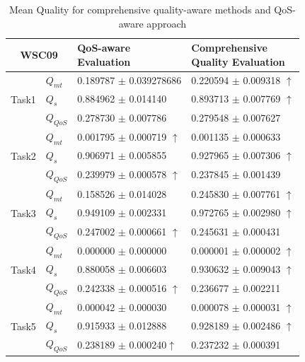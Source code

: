 \documentclass{IEEEtran}
\begin{document}
\begin{table}[]
\footnotesize
\centering
\caption{Mean Quality for comprehensive quality-aware methods and QoS-aware approach}
\label{decisionTable}
\begin{tabular}{l|l|l|l}
\hline
\multicolumn{2}{c|}{WSC09}              & \shortstack{QoS-aware \\ Evaluation} & \shortstack{Comprehensive \\ Quality Evaluation} \\ \hline
\multirow{3}{*}{Task1}  &$Q_{mt}$   &0.189787 $\pm$ 0.039278686  &0.220594 $\pm$ 0.009318 $\uparrow$ \\ \cline{2-4} 
                        &$Q_{s}$    &0.884962 $\pm$ 0.014140   &0.893713 $\pm$ 0.007769  $\uparrow$ \\ \cline{2-4}
                        &$Q_{QoS}$  &0.278730 $\pm$ 0.007786     &0.279548 $\pm$ 0.007627                          \\ \hline
\multirow{3}{*}{Task2}  &$Q_{mt}$   &0.001795 $\pm$ 0.000719 $\uparrow$    &0.001135 $\pm$ 0.000633  \\ \cline{2-4} 
                        &$Q_{s}$    &0.906971 $\pm$ 0.005855     &0.927965 $\pm$ 0.007306 $\uparrow$   \\ \cline{2-4}
                        &$Q_{QoS}$  &0.239979 $\pm$ 0.000578 $\uparrow$     &0.237845 $\pm$ 0.001439 \\ \hline
\multirow{3}{*}{Task3}  &$Q_{mt}$   &0.158526 $\pm$ 0.014028               &  0.245830 $\pm$ 0.007761 $\uparrow$   \\ \cline{2-4} 
                        &$Q_{s}$    &0.949109 $\pm$ 0.002331           &   0.972765 $\pm$ 0.002980 $\uparrow$           \\ \cline{2-4}
                        &$Q_{QoS}$  &0.247002 $\pm$ 0.000661 $\uparrow$             &  0.245631 $\pm$ 0.000431            \\ \hline
\multirow{3}{*}{Task4}  &$Q_{mt}$   &0.000000 $\pm$ 0.000000  &0.000001 $\pm$ 0.000002 $\uparrow$ \\ \cline{2-4} 
                        &$Q_{s}$    &0.880058 $\pm$ 0.006603    &0.930632 $\pm$ 0.009043 $\uparrow$ \\ \cline{2-4}
                        &$Q_{QoS}$  &0.242338 $\pm$ 0.000516 $\uparrow$    &0.236677 $\pm$ 0.002211  \\ \hline
\multirow{3}{*}{Task5}  &$Q_{mt}$   &  0.000042 $\pm$ 0.000030     &  0.000078 $\pm$ 0.000031 $\uparrow$           \\ \cline{2-4} 
                        &$Q_{s}$    &  0.915933 $\pm$ 0.012888      &  0.928189 $\pm$ 0.002486 $\uparrow$                 \\ \cline{2-4}
                        &$Q_{QoS}$  & 0.238189 $\pm$ 0.000240$\uparrow$      &  0.237232 $\pm$  0.000391  \\ \hline                                                   
\end{tabular}
\end{table}
\end{document}
